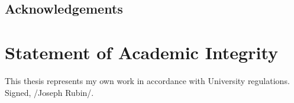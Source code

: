 \documentclass{article}
\begin{document}
\subsection{Acknowledgements}
\section*{Statement of Academic Integrity}
This thesis represents my own work in accordance with University regulations.\\
Signed, /Joseph Rubin/.

\cite{tt}

%



\printindex
\end{document}
